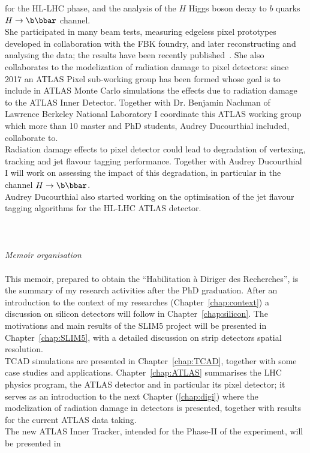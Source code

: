 for the HL-LHC phase, and the analysis of the $H$ Higgs boson decay to $b$ quarks
 $H\to\b\bbar$ channel.
\\She participated in many beam tests, measuring 
edgeless pixel prototypes developed in collaboration with the FBK foundry, and later reconstructing 
and analysing the data; the results have been recently published~\cite{1748-0221-12-05-P05006}. 
She also collaborates to the modelization of radiation damage to pixel detectors: since 2017 
an ATLAS Pixel sub-working group has been formed whose goal is to include in ATLAS Monte Carlo 
simulations the effects due to radiation damage to the ATLAS Inner Detector. Together 
with Dr. Benjamin Nachman of Lawrence Berkeley National Laboratory I coordinate this 
ATLAS working group  which more than 10 master and PhD students, Audrey Ducourthial included, collaborate to.
\\
Radiation damage effects to pixel detector could lead to degradation of vertexing, tracking 
and jet flavour tagging performance. Together with Audrey  Ducourthial I will   work on assessing the impact of this 
degradation, in particular in the channel $H\to\b\bbar$. 
\\Audrey  Ducourthial also started working on the optimisation of the jet flavour tagging algorithms for the
HL-LHC  ATLAS detector. 
\\
\\
\\
\\
{\it Memoir organisation}
\\
\\This memoir, prepared to obtain the ``Habilitation \`a Diriger des Recherches'', is the summary of my 
research activities after the PhD graduation. After an introduction to the context of my researches 
(Chapter~\ref{chap:context}) a discussion on silicon detectors will follow in Chapter~\ref{chap:silicon}.
The motivations and main results of the SLIM5 project will be presented in Chapter~\ref{chap:SLIM5}, 
with a detailed discussion on strip detectors spatial resolution.
\\TCAD simulations are presented in Chapter~\ref{chap:TCAD}, together with some case studies 
and applications.
Chapter~\ref{chap:ATLAS} summarises  the LHC physics program, the ATLAS detector and 
in particular its pixel detector; it serves as an introduction to the next Chapter (\ref{chap:digi}) where 
the modelization of radiation damage in detectors is presented, together with results for the 
current ATLAS data taking.
\\The new ATLAS Inner Tracker, intended for the Phase-II of the experiment, will be presented in 
